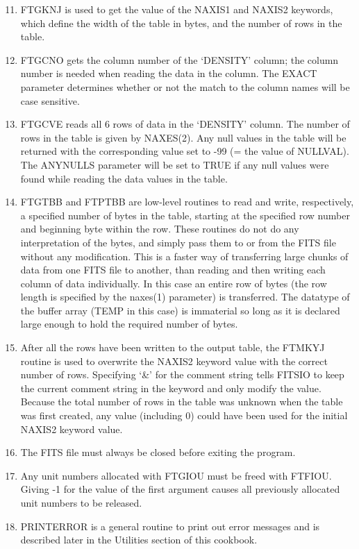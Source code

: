 \begin{enumerate}
\setcounter{enumi}{10}
\item
FTGKNJ is used to get the value of the NAXIS1 and NAXIS2 keywords,
which define the width of the table in bytes, and the number of
rows in the table.
\item
FTGCNO gets the column number of the `DENSITY' column; the column
number is needed when reading the data in the column.  The EXACT
parameter determines whether or not the match to the column names
will be case sensitive.
\item
FTGCVE reads all 6 rows of data in the `DENSITY' column.  The number
of rows in the table is given by NAXES(2). Any null values in the
table will be returned with the corresponding value set to -99
(= the value of NULLVAL).  The ANYNULLS parameter will be set to TRUE
if any null values were found while reading the data values in the table.
\item
FTGTBB and FTPTBB are low-level routines to read and write, respectively,
a specified number of bytes in the table, starting at the specified
row number and beginning byte within the row.  These routines do
not do any interpretation of the bytes, and simply pass them to or
from the FITS file without any modification.  This is a faster
way of transferring large chunks of data from one FITS file to another,
than reading and then writing each column of data individually.
In this case an entire row of bytes (the row length is specified
by the naxes(1) parameter) is transferred.  The datatype of the 
buffer array (TEMP in this case) is immaterial so long as it is
declared large enough to hold the required number of bytes.
\item
After all the rows have been written to the output table, the
FTMKYJ routine is used to overwrite the NAXIS2 keyword value with
the correct number of rows.  Specifying `\&' for the comment string
tells FITSIO to keep the current comment string in the keyword and
only modify the value.  Because the total number of rows in the table
was unknown when the table was first created, any value (including
0) could have been used for the initial NAXIS2 keyword value.
\item
The FITS file must always be closed before exiting the program. 
\item
Any unit numbers allocated with FTGIOU must be freed with FTFIOU. Giving
-1 for the value of the first argument causes all previously allocated
unit numbers to be released.
\item
PRINTERROR is a general routine to print out error messages and is
described later in the Utilities section of this cookbook.
\end{enumerate}

